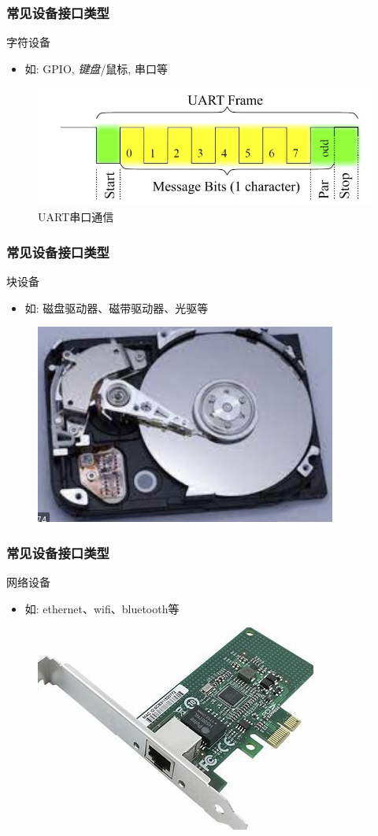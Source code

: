 \begin{frame}[fragile]
    \frametitle{常见设备接口类型}
    字符设备
    \begin{itemize}
        \item 如: GPIO, \emph{键盘}/鼠标, 串口等
    \end{itemize}
    \begin{figure}
        \includegraphics[width=0.6\linewidth]{figs/char-uart.png}
        \caption{UART串口通信}
    \end{figure}
\end{frame}
% 
% 
\begin{frame}[fragile]
    \frametitle{常见设备接口类型}
    块设备
    \begin{itemize}
        \item 如: 磁盘驱动器、磁带驱动器、光驱等
    \end{itemize}
    \begin{figure}
        \includegraphics[width=0.47\linewidth]{figs/blk-dev.png}
    \end{figure}
\end{frame}
% 
\begin{frame}[fragile]
    \frametitle{常见设备接口类型}
    网络设备
    \begin{itemize}
        \item 如: ethernet、wifi、bluetooth等
    \end{itemize}
    \begin{figure}
        \includegraphics[width=0.47\linewidth]{figs/net-dev.png}
    \end{figure}
\end{frame}
